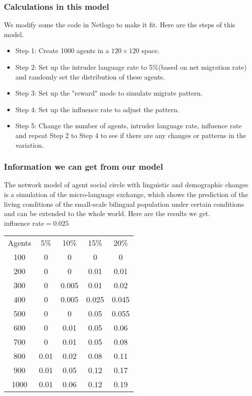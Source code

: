 \documentclass{mcmthesis}
\begin{document}
\subsubsection{Calculations in this model}
\hspace*{8mm}We modify some the code in Netlogo to make it fit. %
Here are the steps of this model.
\begin{itemize}
\item Step 1: Create 1000 agents in a $120\times120$ space.
\item Step 2: Set up the intruder language rate to 5\%(based on net migration rate) and randomly set the distribution of these agents.
\item Step 3: Set up the "reward" mode to simulate migrate pattern.
\item Step 4: Set up the influence rate to adjust the pattern.
\item Step 5: Change the number of agents, intruder language rate, influence rate and repeat Step 2 to Step 4 to see if there are any changes or patterns in the variation.
\end{itemize}

\subsubsection{Information we can get from our model}
\hspace*{8mm}The network model of agent social circle with linguistic and demographic changes is a simulation of the micro-language exchange, which shows the prediction of the living conditions of the small-scale bilingual population under certain conditions and can be extended to the whole world. Here are the results we get.\\

influence rate$=0.025$ 
\begin{tabular}{c|c|c|c|c}
Agents & 5\% & 10\% & 15\% & 20\% \\
100	& 0	& 0	& 0	& 0 \\
200	& 0	& 0	& 0.01 & 0.01 \\
300	& 0	& 0.005	& 0.01 & 0.02 \\
400	& 0	& 0.005	& 0.025	& 0.045 \\
500	& 0	& 0	& 0.05 & 0.055 \\
600	& 0	& 0.01 & 0.05 & 0.06 \\
700	& 0	& 0.01 & 0.05 & 0.08 \\ 
800	& 0.01 & 0.02 & 0.08 & 0.11 \\
900	& 0.01 & 0.05 & 0.12 & 0.17 \\
1000	& 0.01 & 0.06 & 0.12	 & 0.19 \\
\end{tabular} \\ 
\end{document}
